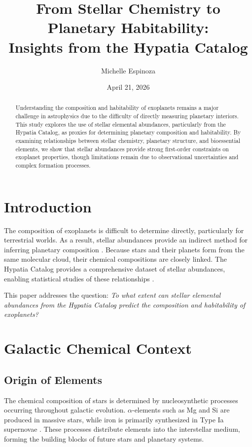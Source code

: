 \documentclass[12pt]{article}
\title{From Stellar Chemistry to Planetary Habitability:\\
Insights from the Hypatia Catalog}
\author{Michelle Espinoza}
\date{April 21, 2026}
\begin{document}
\maketitle

\begin{abstract}
Understanding the composition and habitability of exoplanets remains a major challenge in astrophysics due to the difficulty of directly measuring planetary interiors. This study explores the use of stellar elemental abundances, particularly from the Hypatia Catalog, as proxies for determining planetary composition and habitability. By examining relationships between stellar chemistry, planetary structure, and bioessential elements, we show that stellar abundances provide strong first-order constraints on exoplanet properties, though limitations remain due to observational uncertainties and complex formation processes.
\end{abstract}

\section{Introduction}

The composition of exoplanets is difficult to determine directly, particularly for terrestrial worlds. As a result, stellar abundances provide an indirect method for inferring planetary composition \citep{Hinkel2018}. Because stars and their planets form from the same molecular cloud, their chemical compositions are closely linked. The Hypatia Catalog provides a comprehensive dataset of stellar abundances, enabling statistical studies of these relationships \citep{Hinkel2014}.

This paper addresses the question: \textit{To what extent can stellar elemental abundances from the Hypatia Catalog predict the composition and habitability of exoplanets?}

\section{Galactic Chemical Context}

\subsection{Origin of Elements}

The chemical composition of stars is determined by nucleosynthetic processes occurring throughout galactic evolution. $\alpha$-elements such as Mg and Si are produced in massive stars, while iron is primarily synthesized in Type Ia supernovae \citep{Hinkel2014}. These processes distribute elements into the interstellar medium, forming the building blocks of future stars and planetary systems.
\end{document}
